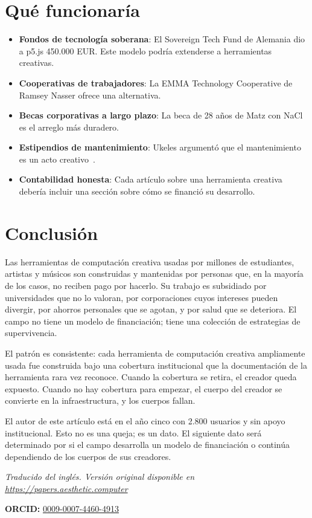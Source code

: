 \documentclass[10pt,letterpaper,twocolumn]{article}
\begin{document}
\section{Qué funcionaría}

\begin{itemize}
  \item \textbf{Fondos de tecnología soberana}: El Sovereign Tech Fund de Alemania dio a p5.js 450.000 EUR. Este modelo podría extenderse a herramientas creativas.
  \item \textbf{Cooperativas de trabajadores}: La EMMA Technology Cooperative de Ramsey Nasser ofrece una alternativa.
  \item \textbf{Becas corporativas a largo plazo}: La beca de 28 años de Matz con NaCl es el arreglo más duradero.
  \item \textbf{Estipendios de mantenimiento}: Ukeles argumentó que el mantenimiento es un acto creativo~\citep{ukeles1969manifesto}.
  \item \textbf{Contabilidad honesta}: Cada artículo sobre una herramienta creativa debería incluir una sección sobre cómo se financió su desarrollo.
\end{itemize}

\section{Conclusión}

Las herramientas de computación creativa usadas por millones de estudiantes, artistas y músicos son construidas y mantenidas por personas que, en la mayoría de los casos, no reciben pago por hacerlo. Su trabajo es subsidiado por universidades que no lo valoran, por corporaciones cuyos intereses pueden divergir, por ahorros personales que se agotan, y por salud que se deteriora. El campo no tiene un modelo de financiación; tiene una colección de estrategias de supervivencia.

El patrón es consistente: cada herramienta de computación creativa ampliamente usada fue construida bajo una cobertura institucional que la documentación de la herramienta rara vez reconoce. Cuando la cobertura se retira, el creador queda expuesto. Cuando no hay cobertura para empezar, el cuerpo del creador se convierte en la infraestructura, y los cuerpos fallan.

El autor de este artículo está en el año cinco con 2.800 usuarios y sin apoyo institucional. Esto no es una queja; es un dato. El siguiente dato será determinado por si el campo desarrolla un modelo de financiación o continúa dependiendo de los cuerpos de sus creadores.

\vspace{0.5em}
\noindent\textit{Traducido del inglés. Versión original disponible en \url{https://papers.aesthetic.computer}}

\vspace{0.5em}
\noindent\textbf{ORCID:} \href{https://orcid.org/0009-0007-4460-4913}{0009-0007-4460-4913}



\end{document}
